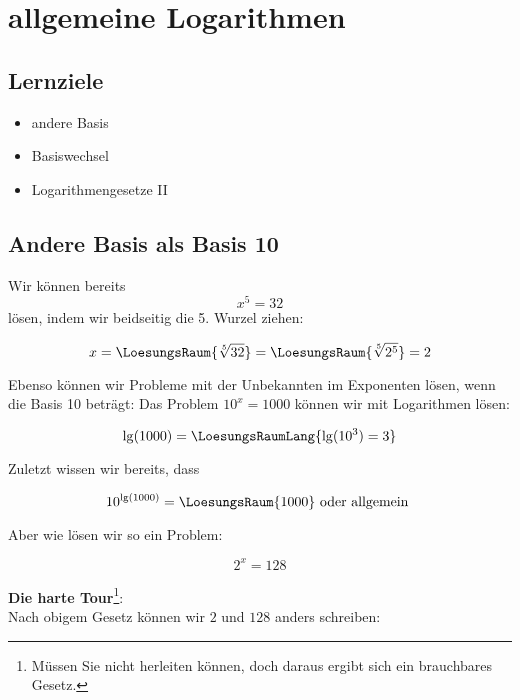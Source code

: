 
\section{allgemeine Logarithmen}
\subsection*{Lernziele}

\begin{itemize}
\item andere Basis
\item Basiswechsel
\item Logarithmengesetze II
\end{itemize}
\newpage

\subsection{Andere Basis als Basis 10}

Wir können bereits $$x^5=32$$ lösen, indem wir beidseitig die
5. Wurzel ziehen:

$$x = \LoesungsRaum{\sqrt[5]{32}} = \LoesungsRaum{\sqrt[5]{2^5}} = 2$$

Ebenso können wir Probleme mit der Unbekannten im Exponenten lösen,
wenn die Basis 10 beträgt: Das Problem $10^x = 1000$ können wir mit
Logarithmen lösen:

$$\lg(1000) = \LoesungsRaumLang{\lg(10^3) = 3}$$

Zuletzt wissen wir bereits, dass

$$10^{\lg(1000)} = \LoesungsRaum{1000} \textrm{ oder allgemein }$$

\begin{center}
\end{center}
\newpage


Aber wie lösen wir so ein Problem:

$$2^x = 128$$

\textbf{Die harte Tour}\footnote{Müssen Sie nicht herleiten können,
  doch daraus ergibt sich ein brauchbares Gesetz.}:\\

Nach obigem Gesetz können wir $2$ und $128$ anders schreiben:


